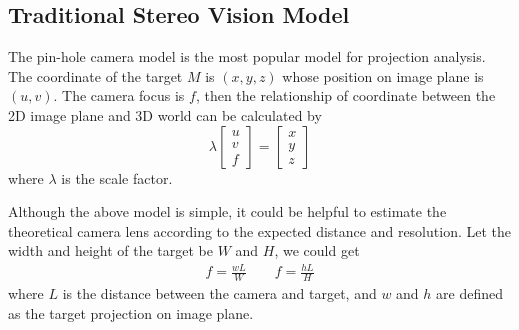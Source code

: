 \subsection{Traditional Stereo Vision Model}
The pin-hole camera model is the most popular model for projection analysis. The coordinate of the target $M$ is $(x,y,z)$ whose position on image plane is $(u,v)$. The camera focus is $f$, then the relationship of coordinate between the 2D image plane and 3D world can be calculated by 
\begin{equation}
	\lambda\left[ {\begin{array}{*{20}{c}}
			u \\ 
			v \\ 
			f 
	\end{array}} \right] =\left[ {\begin{array}{*{20}{c}}
			x \\ 
			y \\ 
			z 
	\end{array}} \right]
\end{equation}
where $\lambda$ is the scale factor. 

%

Although the above model is simple, it could be helpful to estimate the theoretical camera lens according to the expected distance and resolution. Let the width and height of the target be $W$ and $H$, we could get
\begin{align}
	f=\frac{wL}{W} \qquad f=\frac{hL}{H}
\end{align}
where $L$ is the distance between the camera and target, and $w$ and $h$ are defined as the target projection on image plane.
 

